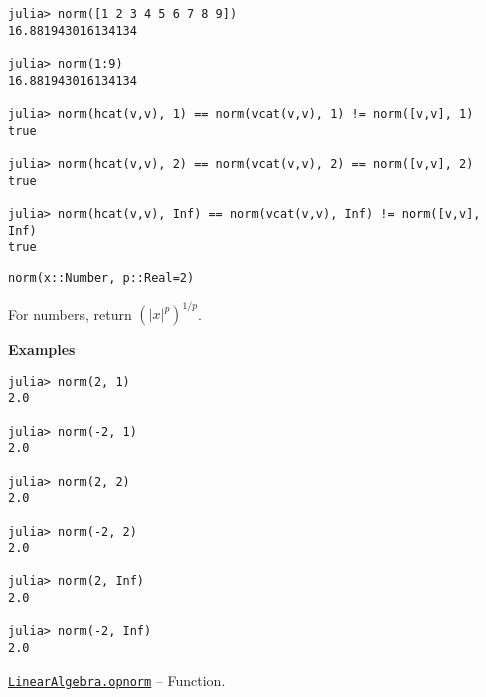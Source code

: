 \begin{adjustwidth}{2em}{0pt}
\begin{verbatim}
julia> norm([1 2 3 4 5 6 7 8 9])
16.881943016134134

julia> norm(1:9)
16.881943016134134

julia> norm(hcat(v,v), 1) == norm(vcat(v,v), 1) != norm([v,v], 1)
true

julia> norm(hcat(v,v), 2) == norm(vcat(v,v), 2) == norm([v,v], 2)
true

julia> norm(hcat(v,v), Inf) == norm(vcat(v,v), Inf) != norm([v,v], Inf)
true
\end{verbatim}




\begin{lstlisting}
norm(x::Number, p::Real=2)
\end{lstlisting}

For numbers, return \(\left( |x|^p \right)^{1/p}\).

\textbf{Examples}


\begin{verbatim}
julia> norm(2, 1)
2.0

julia> norm(-2, 1)
2.0

julia> norm(2, 2)
2.0

julia> norm(-2, 2)
2.0

julia> norm(2, Inf)
2.0

julia> norm(-2, Inf)
2.0
\end{verbatim}



\end{adjustwidth}
\hypertarget{4740175223212326101}{} 
\hyperlink{4740175223212326101}{\texttt{LinearAlgebra.opnorm}}  -- {Function.}

